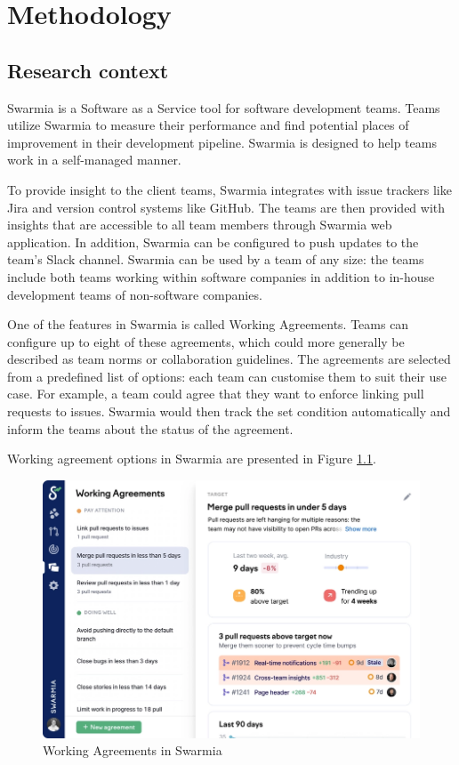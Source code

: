 
\chapter{Methodology}

\section{Research context}

Swarmia is a Software as a Service tool for software development teams. Teams utilize Swarmia to measure their performance and find potential places of improvement in their development pipeline. Swarmia is designed to help teams work in a self-managed manner. 

To provide insight to the client teams, Swarmia integrates with issue trackers like Jira and version control systems like GitHub. The teams are then provided with insights that are accessible to all team members through Swarmia web application. In addition, Swarmia can be configured to push updates to the team's Slack channel. Swarmia can be used by a team of any size: the teams include both teams working within software companies in addition to in-house development teams of non-software companies. 

One of the features in Swarmia is called Working Agreements. Teams can configure up to eight of these agreements, which could more generally be described as team norms or collaboration guidelines. The agreements are selected from a predefined list of options: each team can customise them to suit their use case. For example, a team could agree that they want to enforce linking pull requests to issues. Swarmia would then track the set condition automatically and inform the teams about the status of the agreement. 

Working agreement options in Swarmia are presented in Figure \ref{fig:WorkingAgreements}.



\begin{figure}[h]
    \begin{center}
        \includegraphics[width=13.5cm]{LaTeX/images/improvement.png}
        \caption{Working Agreements in Swarmia}
        \label{fig:WorkingAgreements}
    \end{center}
\end{figure}

